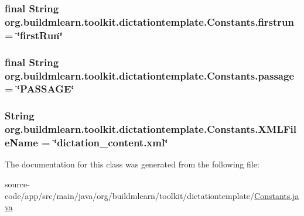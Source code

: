 \subsubsection[{\texorpdfstring{firstrun}{firstrun}}]{\setlength{\rightskip}{0pt plus 5cm}final String org.\+buildmlearn.\+toolkit.\+dictationtemplate.\+Constants.\+firstrun = \char`\"{}first\+Run\char`\"{}\hspace{0.3cm}{\ttfamily [static]}}\hypertarget{classorg_1_1buildmlearn_1_1toolkit_1_1dictationtemplate_1_1Constants_a530737f36d6c28029c8c8db6c4973353}{}\label{classorg_1_1buildmlearn_1_1toolkit_1_1dictationtemplate_1_1Constants_a530737f36d6c28029c8c8db6c4973353}
\subsubsection[{\texorpdfstring{passage}{passage}}]{\setlength{\rightskip}{0pt plus 5cm}final String org.\+buildmlearn.\+toolkit.\+dictationtemplate.\+Constants.\+passage = \char`\"{}P\+A\+S\+S\+A\+GE\char`\"{}\hspace{0.3cm}{\ttfamily [static]}}\hypertarget{classorg_1_1buildmlearn_1_1toolkit_1_1dictationtemplate_1_1Constants_a273ce175a82ae2698e62ab35e9ff3c4c}{}\label{classorg_1_1buildmlearn_1_1toolkit_1_1dictationtemplate_1_1Constants_a273ce175a82ae2698e62ab35e9ff3c4c}
\subsubsection[{\texorpdfstring{X\+M\+L\+File\+Name}{XMLFileName}}]{\setlength{\rightskip}{0pt plus 5cm}String org.\+buildmlearn.\+toolkit.\+dictationtemplate.\+Constants.\+X\+M\+L\+File\+Name = \char`\"{}dictation\+\_\+content.\+xml\char`\"{}\hspace{0.3cm}{\ttfamily [static]}}\hypertarget{classorg_1_1buildmlearn_1_1toolkit_1_1dictationtemplate_1_1Constants_a4341dc3ae5bf3c1cb74ade3143967c2f}{}\label{classorg_1_1buildmlearn_1_1toolkit_1_1dictationtemplate_1_1Constants_a4341dc3ae5bf3c1cb74ade3143967c2f}


The documentation for this class was generated from the following file\+:\begin{DoxyCompactItemize}
\item 
source-\/code/app/src/main/java/org/buildmlearn/toolkit/dictationtemplate/\hyperlink{dictationtemplate_2Constants_8java}{Constants.\+java}\end{DoxyCompactItemize}
